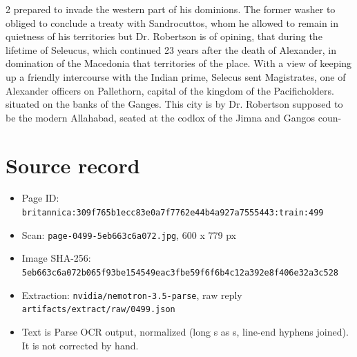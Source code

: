 \documentclass[10pt]{article}
\begin{document}
\begin{multicols}{2}
prepared to invade the western part of his dominions. The former washer to obliged to conclude a treaty with Sandrocuttos, whom he allowed to remain in quietness of his territories but Dr. Robertson is of opining, that during the lifetime of Seleucus, which continued 23 years after the death of Alexander, in domination of the Macedonia that territories of the place. With a view of keeping up a friendly intercourse with the Indian prime, Selecus sent Magistrates, one of Alexander officers on Pallethorn, capital of the kingdom of the Pacificholders. situated on the banks of the Ganges. This city is by Dr. Robertson supposed to be the modern Allahabad, seated at the codlox of the Jimna and Gangos coun-
\end{multicols}
\section*{Source record}
\begin{itemize}
\item Page ID: \texttt{britannica:309f765b1ecc83e0a7f7762e44b4a927a7555443:train:499}
\item Scan: \texttt{page-0499-5eb663c6a072.jpg}, 600 x 779 px
\item Image SHA-256: \texttt{\small 5eb663c6a072b065f93be154549eac3fbe59f6f6b4c12a392e8f406e32a3c528}
\item Extraction: \texttt{nvidia/nemotron-3.5-parse}, raw reply \texttt{artifacts/extract/raw/0499.json}
\item Text is Parse OCR output, normalized (long s as s, line-end hyphens joined). It is not corrected by hand.
\end{itemize}
\end{document}
